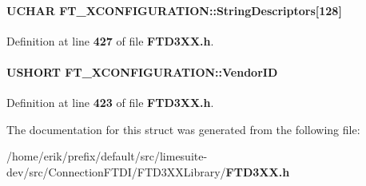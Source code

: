 \paragraph[{String\+Descriptors}]{\setlength{\rightskip}{0pt plus 5cm}U\+C\+H\+AR F\+T\+\_\+X\+C\+O\+N\+F\+I\+G\+U\+R\+A\+T\+I\+O\+N\+::\+String\+Descriptors[128]}\label{structFT__60XCONFIGURATION_a262693a41c7212d2f932a6d830749274}


Definition at line {\bf 427} of file {\bf F\+T\+D3\+X\+X.\+h}.

\paragraph[{Vendor\+ID}]{\setlength{\rightskip}{0pt plus 5cm}U\+S\+H\+O\+RT F\+T\+\_\+X\+C\+O\+N\+F\+I\+G\+U\+R\+A\+T\+I\+O\+N\+::\+Vendor\+ID}\label{structFT__60XCONFIGURATION_a60293b8235be0895ad587514dbfc7a9d}


Definition at line {\bf 423} of file {\bf F\+T\+D3\+X\+X.\+h}.



The documentation for this struct was generated from the following file\+:\begin{DoxyCompactItemize}
\item 
/home/erik/prefix/default/src/limesuite-\/dev/src/\+Connection\+F\+T\+D\+I/\+F\+T\+D3\+X\+X\+Library/{\bf F\+T\+D3\+X\+X.\+h}\end{DoxyCompactItemize}
